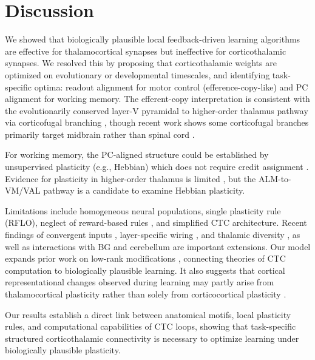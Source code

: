 \documentclass[11pt]{article}
\begin{document}
\section{Discussion}
We showed that biologically plausible local feedback-driven learning algorithms \cite{miconi2017biologically,alemi2018learning,murray2019local,gilra2017predicting} are effective for thalamocortical synapses but ineffective for corticothalamic synapses. We resolved this by proposing that corticothalamic weights are optimized on evolutionary or developmental timescales, and identifying task-specific optima: readout alignment for motor control (efference-copy-like) and PC alignment for working memory. The efferent-copy interpretation is consistent with the evolutionarily conserved layer-V pyramidal to higher-order thalamus pathway via corticofugal branching \cite{bourassa1995cortico,bourassa1995parallel,kakei2001efferent,kita2012role,sherman2016cortical,guillery2011branched,sherman2021thalamic}, though recent work shows some corticofugal branches primarily target midbrain rather than spinal cord \cite{economo2018distinct}.

For working memory, the PC-aligned structure could be established by unsupervised plasticity (e.g., Hebbian) which does not require credit assignment \cite{magee2020synaptic}. Evidence for plasticity in higher-order thalamus is limited \cite{ding2003gfap}, but the ALM-to-VM/VAL pathway is a candidate to examine Hebbian plasticity.

Limitations include homogeneous neural populations, single plasticity rule (RFLO), neglect of reward-based rules \cite{hosp2011dopaminergic,li2017dopamine}, and simplified CTC architecture. Recent findings of convergent inputs \cite{sampathkumar2021integration}, layer-specific wiring \cite{munoz2021cellular}, and thalamic diversity \cite{phillips2019diverse}, as well as interactions with BG and cerebellum \cite{tanaka2018learning} are important extensions. Our model expands prior work on low-rank modifications \cite{mastrogiuseppe2018linking,schuessler2020inter}, connecting theories of CTC computation \cite{kao2021optimal,logiaco2021thalamic} to biologically plausible learning. It also suggests that cortical representational changes observed during learning \cite{huber2012multiple,peters2014emergence,masamizu2014two} may partly arise from thalamocortical plasticity rather than solely from corticocortical plasticity \cite{biane2015spinocortical,biane2019motor,hasegawa2020selective,wang2022thalamocortical}.

Our results establish a direct link between anatomical motifs, local plasticity rules, and computational capabilities of CTC loops, showing that task-specific structured corticothalamic connectivity is necessary to optimize learning under biologically plausible plasticity.



\end{document}
